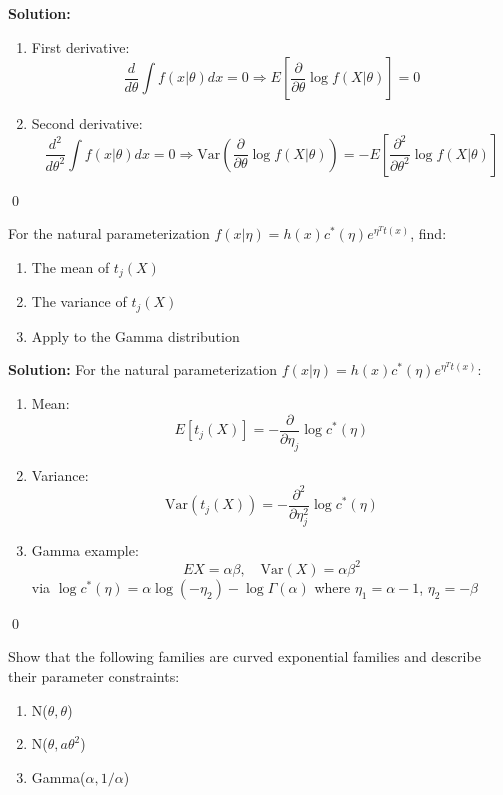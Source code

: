 \noindent\textbf{Solution:}
\begin{enumerate}[label=(\alph*)]
\item First derivative:
\[ \frac{d}{d\theta}\int f(x|\theta)dx = 0 \Rightarrow E\left[\frac{\partial}{\partial\theta}\log f(X|\theta)\right] = 0 \]

\item Second derivative:
\[ \frac{d^2}{d\theta^2}\int f(x|\theta)dx = 0 \Rightarrow \text{Var}\left(\frac{\partial}{\partial\theta}\log f(X|\theta)\right) = -E\left[\frac{\partial^2}{\partial\theta^2}\log f(X|\theta)\right] \]
\end{enumerate}


\qed
\begin{problembox}
For the natural parameterization $f(x|\eta) = h(x)c^*(\eta)e^{\eta^T t(x)}$, find:
\begin{enumerate}
\item The mean of $t_j(X)$
\item The variance of $t_j(X)$
\item Apply to the Gamma distribution
\end{enumerate}
\end{problembox}

\noindent\textbf{Solution:}
For the natural parameterization $f(x|\eta) = h(x)c^*(\eta)e^{\eta^T t(x)}$:
\begin{enumerate}
\item Mean:
\[ E[t_j(X)] = -\frac{\partial}{\partial\eta_j}\log c^*(\eta) \]

\item Variance:
\[ \text{Var}(t_j(X)) = -\frac{\partial^2}{\partial\eta_j^2}\log c^*(\eta) \]

\item Gamma example:
\[ EX = \alpha\beta, \quad \text{Var}(X) = \alpha\beta^2 \]
via $\log c^*(\eta) = \alpha\log(-\eta_2) - \log\Gamma(\alpha)$ where $\eta_1 = \alpha-1$, $\eta_2 = -\beta$
\end{enumerate}


\qed
\begin{problembox}
Show that the following families are curved exponential families and describe their parameter constraints:
\begin{enumerate}[label=(\alph*)]
\item N($\theta,\theta$)
\item N($\theta,a\theta^2$)
\item Gamma($\alpha,1/\alpha$)
\end{enumerate}
\end{problembox}

